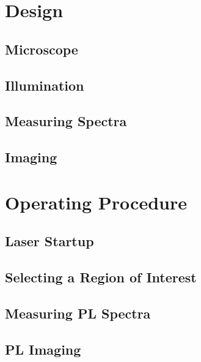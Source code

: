 \section{Design}
\subsection{Microscope}
\subsection{Illumination}
\subsection{Measuring Spectra}
\subsection{Imaging}

\section{Operating Procedure}
\subsection{Laser Startup} %
\subsection{Selecting a Region of Interest}
\subsection{Measuring PL Spectra}
\subsection{PL Imaging}